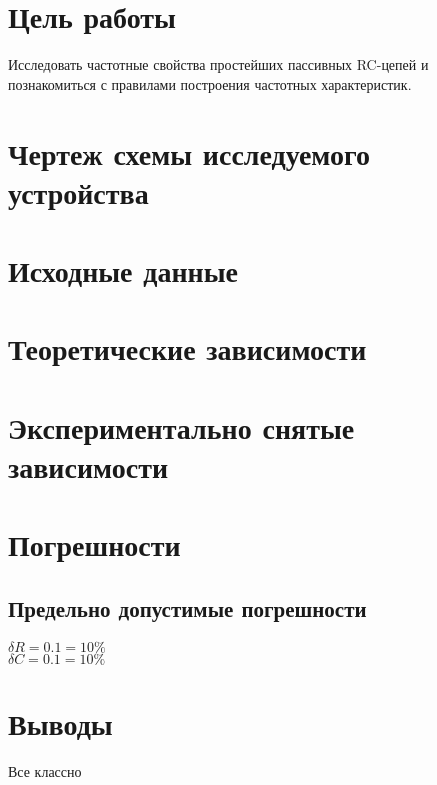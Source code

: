 





\section{Цель работы}
Исследовать частотные свойства простейших пассивных RC­-цепей и познакомиться с правилами построения частотных характеристик.


\section{Чертеж схемы исследуемого устройства}


\section{Исходные данные}


\section{Теоретические зависимости}

\section{Экспериментально снятые зависимости}


\section{Погрешности}

\subsection{Предельно допустимые погрешности}
\begin{center}
$\delta R = 0.1 = 10\%$\\
$\delta C = 0.1 = 10\%$\\
\end{center}

  
\section{Выводы}
Все классно

